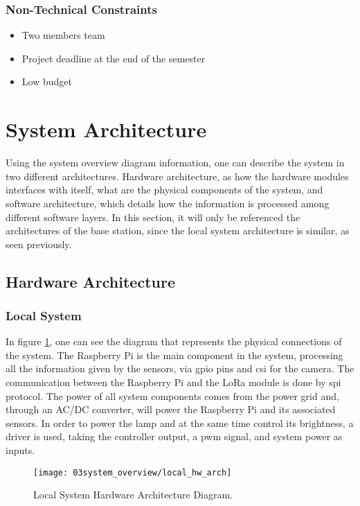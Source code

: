 \subsubsection{Non-Technical Constraints}
\begin{itemize}
        \item Two members team
        \item Project deadline at the end of the semester
        \item Low budget
\end{itemize}

\section{System Architecture}
Using the system overview diagram information, one can describe the system in two different architectures. Hardware architecture, as how the hardware modules interfaces with itself, what are the physical components of the system, and software architecture, which details how the information is processed among different software layers. In this section, it will only be referenced the architectures of the base station, since the local system architecture is similar, as seen previously. 

\subsection{Hardware Architecture}

\subsubsection{Local System}

In figure \ref{fig:local_hw_arch}, one can see the diagram that represents the physical connections of the system. The Raspberry Pi is the main component in the system, processing all the information given by the sensors, via \ac{gpio} pins and \ac{csi} for the camera. The communication between the Raspberry Pi and the LoRa module is done by \ac{spi} protocol.
The power of all system components comes from the power grid and, through an AC/DC converter, will power the Raspberry Pi and its associated sensors.
In order to power the lamp and at the same time control its brightness, a driver is used, taking the controller output, a \ac{pwm} signal, and system power as inputs. 

\begin{figure}[ht]
	\centering
	\texttt{[image: 03system\_overview/local\_hw\_arch]}
	\caption{Local System Hardware Architecture Diagram.}
	\label{fig:local_hw_arch}
\end{figure}

